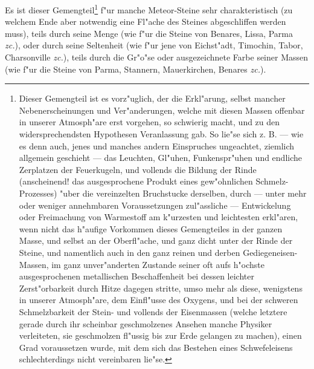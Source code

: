 \documentclass[a4paper, 11pt, oneside, german]{article}
\begin{document}
Es ist dieser Gemengteil\footnote{Dieser Gemengteil ist es vorz"uglich, der die Erkl"arung, selbst mancher Nebenerscheinungen und Ver"anderungen, welche mit diesen Massen offenbar in unserer Atmosph"are erst vorgehen, so schwierig macht, und zu den widersprechendsten Hypothesen Veranlassung gab. So lie"se sich z. B. --- wie es denn auch, jenes und manches andern Einspruches ungeachtet, ziemlich allgemein geschieht --- das Leuchten, Gl"uhen, Funkenspr"uhen und endliche Zerplatzen der Feuerkugeln, und vollends die Bildung der Rinde (anscheinend! das ausgesprochene Produkt eines gew"ohnlichen Schmelz-Prozesses) "uber die vereinzelten Bruchstucke derselben, durch --- unter mehr oder weniger annehmbaren Voraussetzungen zul"assliche --- Entwickelung oder Freimachung von Warmestoff am k"urzesten und leichtesten erkl"aren, wenn nicht das h"aufige Vorkommen dieses Gemengteiles in der ganzen Masse, und selbst an der Oberfl"ache, und ganz dicht unter der Rinde der Steine, und namentlich auch in den ganz reinen und derben Gediegeneisen-Massen, im ganz unver"anderten Zustande seiner oft aufs h"ochste ausgesprochenen metallischen Beschaffenheit bei dessen leichter Zerst"orbarkeit durch Hitze dagegen stritte, umso mehr als diese, wenigstens in unserer Atmosph"are, dem Einfl"usse des Oxygens, und bei der schweren Schmelzbarkeit der Stein- und vollends der Eisenmassen (welche letztere gerade durch ihr scheinbar geschmolzenes Ansehen manche Physiker verleiteten, sie geschmolzen fl"ussig bis zur Erde gelangen zu machen), einen Grad voraussetzen wurde, mit dem sich das Bestehen eines Schwefeleisens schlechterdings nicht vereinbaren lie"se.} f"ur manche Meteor-Steine sehr charakteristisch (zu welchem Ende aber notwendig eine Fl"ache des Steines abgeschliffen werden muss), teils durch seine Menge (wie f"ur die Steine von Benares, Lissa, Parma \emph{zc.}), oder durch seine Seltenheit (wie f"ur jene von Eichst"adt, Timochin, Tabor, Charsonville \emph{zc.}), teils durch die Gr"o"se oder ausgezeichnete Farbe seiner Massen (wie f"ur die Steine von Parma, Stannern, Mauerkirchen, Benares \emph{zc.}).
\end{document}
